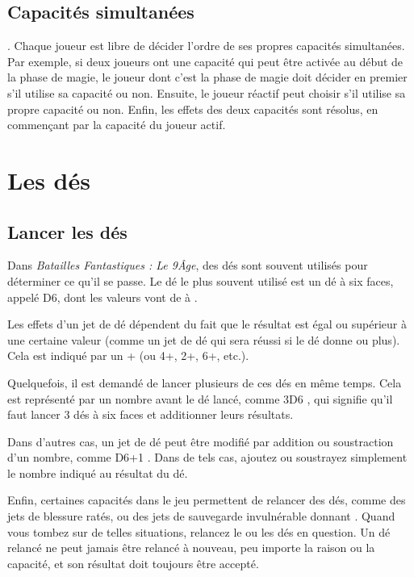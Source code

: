 \subsection{Capacités simultanées}

. Chaque joueur est libre de décider l'ordre de ses propres capacités simultanées. Par exemple, si deux joueurs ont une capacité qui peut être activée au début de la phase de magie, le joueur dont c'est la phase de magie doit décider en premier s'il utilise sa capacité ou non. Ensuite, le joueur réactif peut choisir s'il utilise sa propre capacité ou non. Enfin, les effets des deux capacités sont résolus, en commençant par la capacité du joueur actif.

\section{Les dés}

\subsection{Lancer les dés}

Dans \emph{Batailles Fantastiques : Le 9\ieme Âge}, des dés sont souvent utilisés pour déterminer ce qu'il se passe. Le dé le plus souvent utilisé est un dé à six faces, appelé D6, dont les valeurs vont de  à .

Les effets d'un jet de dé dépendent du fait que le résultat est égal ou supérieur à une certaine valeur (comme un jet de dé qui sera réussi si le dé donne  ou plus). Cela est indiqué par un + \fg{} (ou 4+, 2+, 6+, etc.).

Quelquefois, il est demandé de lancer plusieurs de ces dés en même temps. Cela est représenté par un nombre avant le dé lancé, comme \og 3D6 \fg , qui signifie qu'il faut lancer 3 dés à six faces et additionner leurs résultats.

Dans d'autres cas, un jet de dé peut être modifié par addition ou soustraction d'un nombre, comme \og D6+1 \fg . Dans de tels cas, ajoutez ou soustrayez simplement le nombre indiqué au résultat du dé.

Enfin, certaines capacités dans le jeu permettent de relancer des dés, comme des jets de blessure ratés, ou des jets de sauvegarde invulnérable donnant . Quand vous tombez sur de telles situations, relancez le ou les dés en question. Un dé relancé ne peut jamais être relancé à nouveau, peu importe la raison ou la capacité, et son résultat doit toujours être accepté.

